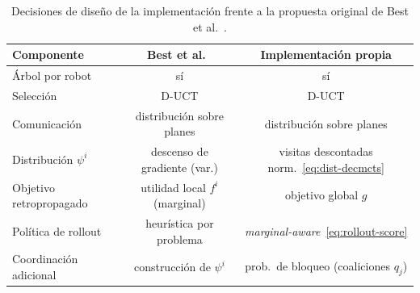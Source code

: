\begin{table}[t]
\centering
\caption{Decisiones de diseño de la implementación frente a la propuesta original de Best et al.~\cite{best2019decmcts}.}
\label{tab:decmcts-vs-paper}
\begin{tabular}{lcc}
\hline
\textbf{Componente} & \textbf{Best et al.~\cite{best2019decmcts}} & \textbf{Implementación propia} \\
\hline
Árbol por robot              & sí                              & sí \\
Selección                    & D-UCT                           & D-UCT \\
Comunicación                 & distribución sobre planes       & distribución sobre planes \\
Distribución $\psi^{i}$         & descenso de gradiente (var.)    & visitas descontadas norm.~\eqref{eq:dist-decmcts} \\
Objetivo retropropagado      & utilidad local $f^{i}$ (marginal) & objetivo global $g$ \\
Política de rollout          & heurística por problema         & \textit{marginal-aware}~\eqref{eq:rollout-score} \\
Coordinación adicional       & construcción de $\psi^i$ & prob.~de bloqueo (coaliciones $q_j$) \\
\hline
\end{tabular}
\end{table}


